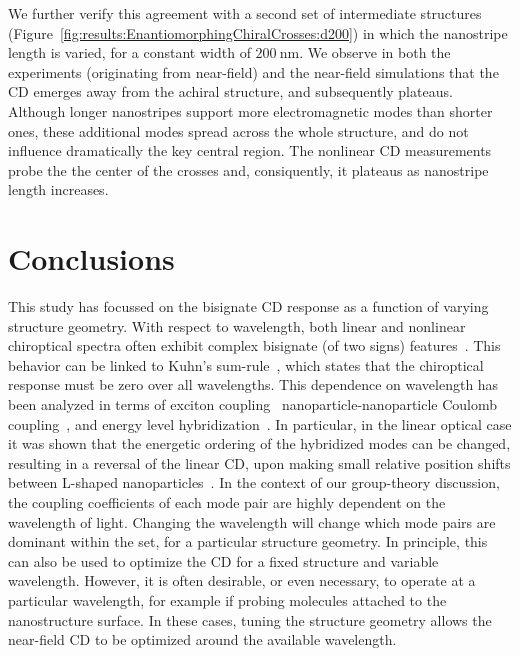 We further verify this agreement with a second set of intermediate structures (Figure~\ref{fig:results:EnantiomorphingChiralCrosses:d200}) in which the nanostripe length is varied, for a constant width of $\SI{200}{\nano\m}$. We observe in both the experiments (originating from near-field) and the near-field simulations that the CD emerges away from the achiral structure, and subsequently plateaus. Although longer nanostripes support more electromagnetic modes than shorter ones, these additional modes spread across the whole structure, and do not influence dramatically the key central region. The nonlinear CD measurements probe the the center of the crosses and, consiquently, it plateaus as nanostripe length increases.

\section{Conclusions}\label{sec:results:EnantiomorphingChiralCrosses:conclusions}

This study has focussed on the bisignate CD response as a function of varying structure geometry. With respect to wavelength, both linear and nonlinear chiroptical spectra often exhibit complex bisignate (of two signs) features~\cite{Li2015, Lee2013, Decker2007, Droulias2013, Plum2009}. This behavior can be linked to Kuhn’s sum-rule~\cite{Kuhn1930}, which states that the chiroptical response must be zero over all wavelengths. This dependence on wavelength has been analyzed in terms of exciton coupling~\cite{Guerrero-Martinez2011} nanoparticle-nanoparticle Coulomb coupling~\cite{Fan2010}, and energy level hybridization~\cite{Auguie2011a}.
In particular, in the linear optical case it was shown that the energetic ordering of the hybridized modes can be changed, resulting in a reversal of the linear CD, upon making small relative position shifts between L-shaped nanoparticles~\cite{Hentschel2015}.
In the context of our group-theory discussion, the coupling coefficients of each mode pair are highly dependent on the wavelength of light. Changing the wavelength will change which mode pairs are dominant within the set, for a particular structure geometry. In principle, this can also be used to optimize the CD for a fixed structure and variable wavelength. However, it is often desirable, or even necessary, to operate at a particular wavelength, for example if probing molecules attached to the nanostructure surface. In these cases, tuning the structure geometry allows the near-field CD to be optimized around the available wavelength.

